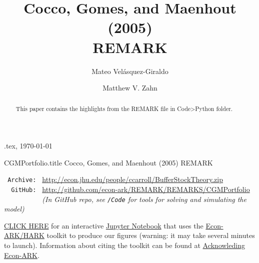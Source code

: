 \documentclass[./CGMPortfolio.tex]{subfiles}
\begin{document}
\hfill{\tiny \texname.tex, \today}

\begin{verbatimwrite}{CGMPortfolio.title}  %
Cocco, Gomes, and Maenhout (2005) REMARK
\end{verbatimwrite}

\title{Cocco, Gomes, and Maenhout (2005) \\ REMARK}

\author{Mateo Vel\'asquez-Giraldo \and Matthew V. Zahn}


\maketitle 

\hypertarget{abstract}{}
\begin{abstract}
This paper contains the highlights from the REMARK file in Code>Python folder.
\end{abstract}

\hypertarget{links}{}
\begin{small}
\parbox{\textwidth}{
\begin{center}
\begin{tabbing}
\texttt{~Archive:~} \= \= \url{http://econ.jhu.edu/people/ccarroll/BufferStockTheory.zip} \kill \\  %
\texttt{~~GitHub:~} \> \> 
\url{http://github.com/econ-ark/REMARK/REMARKS/CGMPortfolio} \\
\texttt{~~~~~~~~~~} \> \> \textit{(In GitHub repo, see \texttt{/Code} for tools for solving and simulating the model)} \\
\end{tabbing}
\end{center}
          
\href{https://mybinder.org/v2/gh/matthew-zahn/CGMPort/develop?filepath=REMARK\%2FCGM_REMARK.ipynb}{CLICK HERE} for an interactive \href{https://en.wikipedia.org/wiki/Project\_Jupyter\#Jupyter_Notebook}{Jupyter Notebook} that uses the \href{https://econ-ark/HARK}{Econ-ARK/HARK} toolkit to produce our figures (warning: it may take several minutes to launch).  Information about citing the toolkit can be found at \href{https://econ-ark.org/acknowledging/}{Acknowleding Econ-ARK}.
} %
\end{small}

\begin{authorsinfo}
\end{authorsinfo}
\end{document}
